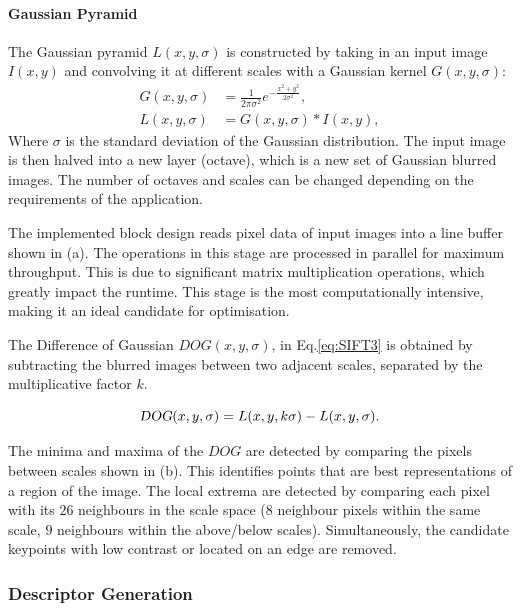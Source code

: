 \paragraph{Gaussian Pyramid}
The Gaussian pyramid $L(x,y,\sigma)$ is constructed by taking in an input image $I(x,y)$ and convolving it at different scales with a Gaussian kernel $G(x,y,\sigma)$:
\begin{align}\label{eq:SIFT1}
    G(x,y,\sigma) &= \frac{1}{2 \pi \sigma ^2} e^{- \frac{x^2 + y^2}{2 \sigma ^2}}, \\
    L(x,y,\sigma)&=G(x,y,\sigma) * I(x,y),
\end{align}
Where $\sigma$ is the standard deviation of the Gaussian distribution. The input image is then halved into a new layer (octave), which is a new set of Gaussian blurred images. The number of octaves and scales can be changed depending on the requirements of the application.

The implemented block design reads pixel data of input images into a line buffer shown in (a). The operations in this stage are processed in parallel for maximum throughput. This is due to significant matrix multiplication operations, which greatly impact the runtime. This stage is the most computationally intensive, making it an ideal candidate for optimisation.


The Difference of Gaussian ${DOG}(x,y,\sigma)$, in Eq.\ref{eq:SIFT3} is obtained by subtracting the blurred images between two adjacent scales, separated by the multiplicative factor $k$. 

\begin{equation}\label{eq:SIFT3}
    \textsl{DOG}(x,y,\sigma)=L(x,y,k\sigma)-L(x,y,\sigma).
\end{equation}

The minima and maxima of the $DOG$ are detected by comparing the pixels between scales shown in (b). This identifies points that are best representations of a region of the image. The local extrema are detected by comparing each pixel with its $26$ neighbours in the scale space ($8$ neighbour pixels within the same scale, $9$ neighbours within the above/below scales). Simultaneously, the candidate keypoints with low contrast or located on an edge are removed.

\subsubsection*{Descriptor Generation}

